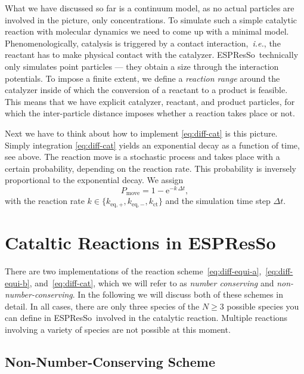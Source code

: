 \documentclass[aip,jcp,reprint,a4paper,onecolumn,nofootinbib,amsmath,amssymb]{revtex4-1}
\newcommand{\es}{\mbox{\textsf{ESPResSo}}\xspace}
\begin{document}
What we have discussed so far is a continuum model, as no actual particles are involved in the picture, only concentrations. To simulate such a simple catalytic reaction with molecular dynamics we need to come up with a minimal model. Phenomenologically, catalysis is triggered by a contact interaction,~\emph{i.e.}, the reactant has to make physical contact with the catalyzer. \es\ technically only simulates point particles --- they obtain a size through the interaction potentials. To impose a finite extent, we define a \emph{reaction range} around the catalyzer inside of which the conversion of a reactant to a product is feasible. This means that we have explicit catalyzer, reactant, and product particles, for which the inter-particle distance imposes whether a reaction takes place or not.

Next we have to think about how to implement \eqref{eq:diff-cat} is this picture. Simply integration \eqref{eq:diff-cat} yields an exponential decay as a function of time, see above. The reaction move is a stochastic process and takes place with a certain probability, depending on the reaction rate. This probability is inversely proportional to the exponential decay. We assign
\begin{equation}
  \label{eq:prob}
  P_{\text{move}} = 1 - \mathrm{e}^{-k\,\Delta t} ,
\end{equation}
with the reaction rate $k \in \{ k_{\text{eq},+}, k_{\text{eq},-}, k_{\text{ct}} \}$ and the simulation time step $\Delta t$.

\section{Cataltic Reactions in \es}

There are two implementations of the reaction scheme~\eqref{eq:diff-equi-a},~\eqref{eq:diff-equi-b}, and~\eqref{eq:diff-cat}, which we will refer to as \emph{number conserving} and \emph{non-number-conserving}. In the following we will discuss both of these schemes in detail. In all cases, there are only three species of the $N \ge 3$ possible species you can define in \es\ involved in the catalytic reaction. Multiple reactions involving a variety of species are not possible at this moment.

\subsection{Non-Number-Conserving Scheme}
\end{document}
